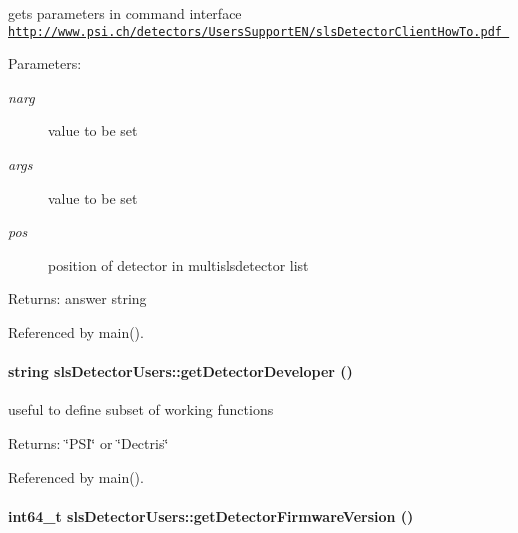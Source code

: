 gets parameters in command interface \href{http://www.psi.ch/detectors/UsersSupportEN/slsDetectorClientHowTo.pdf}\tt{http://www.psi.ch/detectors/Users\-Support\-EN/sls\-Detector\-Client\-How\-To.pdf} 

\begin{Desc}
\item[Parameters:]
\begin{description}
\item[{\em narg}]value to be set \item[{\em args}]value to be set \item[{\em pos}]position of detector in multislsdetector list \end{description}
\end{Desc}
\begin{Desc}
\item[Returns:]answer string \end{Desc}


Referenced by main().\hypertarget{classslsDetectorUsers_30c2ba51c33cc914f290a0b7891da4ec}{
\paragraph[getDetectorDeveloper]{\setlength{\rightskip}{0pt plus 5cm}string sls\-Detector\-Users::get\-Detector\-Developer ()}\hfill}
\label{classslsDetectorUsers_30c2ba51c33cc914f290a0b7891da4ec}


useful to define subset of working functions 

\begin{Desc}
\item[Returns:]\char`\"{}PSI\char`\"{} or \char`\"{}Dectris\char`\"{} \end{Desc}


Referenced by main().\hypertarget{classslsDetectorUsers_2cbba4518b585064f7870ae2d39a8b8b}{
\paragraph[getDetectorFirmwareVersion]{\setlength{\rightskip}{0pt plus 5cm}int64\_\-t sls\-Detector\-Users::get\-Detector\-Firmware\-Version ()}\hfill}
\label{classslsDetectorUsers_2cbba4518b585064f7870ae2d39a8b8b}



